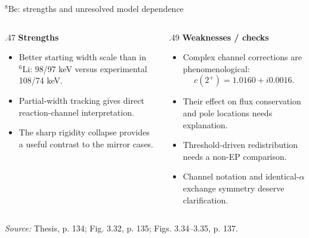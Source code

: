 \documentclass[aspectratio=169,11pt]{beamer}
\newcommand{\nuc}[2]{\ensuremath{{}^{#1}\mathrm{#2}}}
\newcommand{\src}[1]{\par\vfill{\color{muted}\fontsize{7.5}{9}\selectfont\textit{Source:} #1\par}}
\begin{document}
\begin{frame}{\nuc{8}{Be}: strengths and unresolved model dependence}
\begin{columns}[T]
\begin{column}{.47\textwidth}
\textbf{Strengths}
\begin{itemize}\setlength\itemsep{2mm}
\item Better starting width scale than in \nuc{6}{Li}: 98/97 keV versus experimental 108/74 keV.
\item Partial-width tracking gives direct reaction-channel interpretation.
\item The sharp rigidity collapse provides a useful contrast to the mirror cases.
\end{itemize}
\end{column}
\begin{column}{.49\textwidth}
\textbf{Weaknesses / checks}
\begin{itemize}\setlength\itemsep{2mm}
\item Complex channel corrections are phenomenological:
\[c(2^+)=1.0160+i0.0016.\]
\item Their effect on flux conservation and pole locations needs explanation.
\item Threshold-driven redistribution needs a non-EP comparison.
\item Channel notation and identical-$\alpha$ exchange symmetry deserve clarification.
\end{itemize}
\end{column}
\end{columns}
\src{Thesis, p. 134; Fig. 3.32, p. 135; Figs. 3.34--3.35, p. 137.}
\end{frame}
\end{document}
